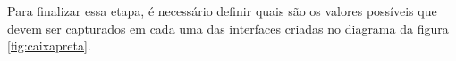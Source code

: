 Para finalizar essa etapa, é necessário definir quais são os valores possíveis que devem ser capturados em cada uma das interfaces criadas no diagrama da figura \ref{fig:caixapreta}.

